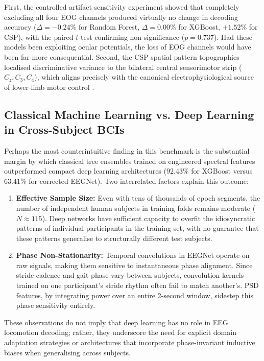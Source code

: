 \documentclass[11pt,a4paper]{article}
\begin{document}
First, the controlled artifact sensitivity experiment showed that completely excluding all four EOG channels produced virtually no change in decoding accuracy ($\Delta = -0.24\%$ for Random Forest, $\Delta = 0.00\%$ for XGBoost, $+1.52\%$ for CSP), with the paired $t$-test confirming non-significance ($p = 0.737$). Had these models been exploiting ocular potentials, the loss of EOG channels would have been far more consequential. Second, the CSP spatial pattern topographies localised discriminative variance to the bilateral central sensorimotor strip ($C_z, C_3, C_4$), which aligns precisely with the canonical electrophysiological source of lower-limb motor control \cite{gwin2011electrocortical, luu2017gait}.

\subsection{Classical Machine Learning vs. Deep Learning in Cross-Subject BCIs}
Perhaps the most counterintuitive finding in this benchmark is the substantial margin by which classical tree ensembles trained on engineered spectral features outperformed compact deep learning architectures ($92.43\%$ for XGBoost versus $63.41\%$ for corrected EEGNet). Two interrelated factors explain this outcome:
\begin{enumerate}
    \item \textbf{Effective Sample Size:} Even with tens of thousands of epoch segments, the number of independent human subjects in training folds remains moderate ($N \approx 115$). Deep networks have sufficient capacity to overfit the idiosyncratic patterns of individual participants in the training set, with no guarantee that these patterns generalise to structurally different test subjects.
    \item \textbf{Phase Non-Stationarity:} Temporal convolutions in EEGNet operate on raw signals, making them sensitive to instantaneous phase alignment. Since stride cadence and gait phase vary between subjects, convolution kernels trained on one participant's stride rhythm often fail to match another's. PSD features, by integrating power over an entire 2-second window, sidestep this phase sensitivity entirely.
\end{enumerate}

These observations do not imply that deep learning has no role in EEG locomotion decoding; rather, they underscore the need for explicit domain adaptation strategies or architectures that incorporate phase-invariant inductive biases when generalising across subjects.
\end{document}
